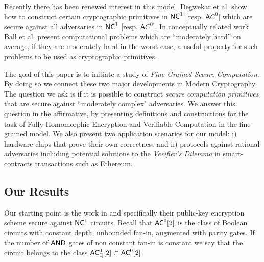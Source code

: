 Recently there has been renewed interest in this model. Degwekar et al. \cite{fgcrypto} show how to construct certain cryptographic 
primitives in ${\mathsf{NC}}^1$ [resp. ${\mathsf AC}^0$] which are secure against all adversaries in ${\mathsf{NC}}^1$ [resp. ${\mathsf AC}^0$]. In conceptually related work Ball et al. \cite{fghardness} present computational problems which are ``moderately hard'' on average, if they are moderately hard in the worst case, a useful property for such problems to be used as cryptographic primitives. 

The goal of this paper is to initiate a study of {\em Fine Grained Secure Computation}. By doing so we connect these two major developments in Modern Cryptography. The question we ask is if it is possible to construct {\em secure computation primitives} that are secure against ``moderately complex" adversaries. We answer this question in the affirmative, by presenting definitions and constructions for the task of Fully Homomorphic Encryption and Verifiable Computation in the fine-grained model. We also present two application scenarios for our model: i) hardware chips that prove their own correctness and ii) protocols against rational adversaries including potential solutions to the {\em Verifier's Dilemma} in smart-contracts transactions such as Ethereum. 

\subsection{Our Results}

Our starting point is the work in \cite{fgcrypto} and specifically their public-key encryption scheme secure against ${\mathsf{NC}}^1$ circuits. Recall that ${\mathsf{AC}}^0[2]$ is the class of Boolean circuits with constant depth, unbounded fan-in, 
augmented with parity gates. If the number of $\mathsf{AND}$ gates of non constant fan-in is constant we say that the circuit belongs to the class ${\mathsf{AC}}^0_{\text{Q}}[2] \subset {\ensuremath{\mathsf{AC}}}^0[2]$.


